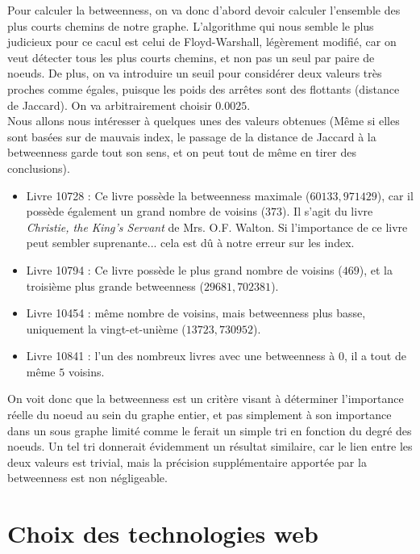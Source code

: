 \documentclass{article}
\begin{document}
Pour calculer la betweenness, on va donc d'abord devoir calculer l'ensemble des plus courts chemins de notre graphe. L'algorithme qui nous semble le plus judicieux pour ce cacul est celui de Floyd-Warshall, légèrement modifié, car on veut détecter tous les plus courts chemins, et non pas un seul par paire de noeuds. De plus, on va introduire un seuil pour considérer deux valeurs très proches comme égales, puisque les poids des arrêtes sont des flottants (distance de Jaccard). On va arbitrairement choisir $0.0025$.\\

Nous allons nous intéresser à quelques unes des valeurs obtenues (Même si elles sont basées sur de mauvais index, le passage de la distance de Jaccard à la betweenness garde tout son sens, et on peut tout de même en tirer des conclusions).\\

\begin{itemize}
\item Livre 10728 : Ce livre possède la betweenness maximale ($60133,971429$), car il possède également un grand nombre de voisins ($373$). Il s'agit du livre  \textit{Christie, the King's Servant} de Mrs. O.F. Walton. Si l'importance de ce livre peut sembler suprenante... cela est dû à notre erreur sur les index.
\item Livre 10794 : Ce livre possède le plus grand nombre de voisins ($469$), et la troisième plus grande betweenness ($29681,702381$).
\item Livre 10454 : même nombre de voisins, mais betweenness plus basse, uniquement la vingt-et-unième ($13723,730952$).
\item Livre 10841 : l'un des nombreux livres avec une betweenness à $0$, il a tout de même $5$ voisins.\\
\end{itemize}

On voit donc que la betweenness est un critère visant à déterminer l'importance réelle du noeud au sein du graphe entier, et pas simplement à son importance dans un sous graphe limité comme le ferait un simple tri en fonction du degré des noeuds. Un tel tri donnerait évidemment un résultat similaire, car le lien entre les deux valeurs est trivial, mais la précision supplémentaire apportée par la betweenness est non négligeable.

\newpage

\section{Choix des technologies web}
\end{document}
